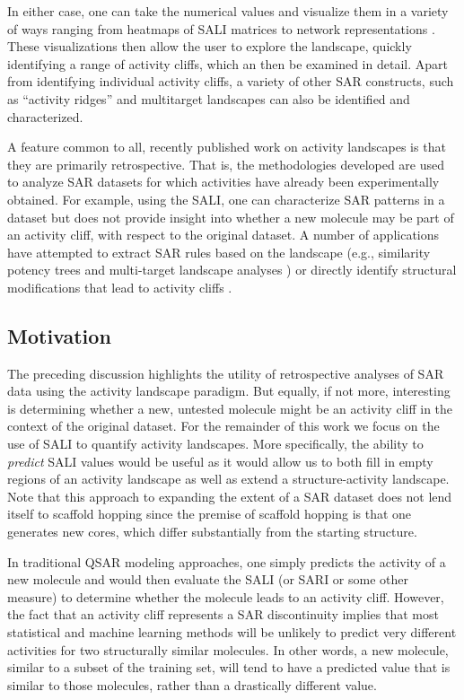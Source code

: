 \documentclass[letterpaper, 12pt]{article}
\begin{document}
In either case, one can take the numerical values and visualize them in a variety of ways ranging
from heatmaps of SALI matrices to network representations \cite{Wawer:2008aa,Guha:2008aa}. These
visualizations then allow the user to explore the landscape, quickly identifying a range of activity
cliffs, which an then be examined in detail. Apart from identifying individual activity cliffs, a
variety of other SAR constructs, such as ``activity ridges'' \cite{Vogt:2011bs} and multitarget
landscapes\cite{Dimova:2011fk} can also be identified and characterized.

A feature common to all, recently published work on activity landscapes is that they are primarily
retrospective. That is, the methodologies developed are used to analyze SAR datasets for which
activities have already been experimentally obtained. For example, using the SALI, one can
characterize SAR patterns in a dataset but does not provide insight into whether a new molecule may
be part of an activity cliff, with respect to the original dataset. A number of applications have
attempted to extract SAR rules based on the landscape (e.g., similarity potency trees
\cite{Wawer:2010fv} and multi-target landscape analyses \cite{Hu:2010kl}) or directly identify
structural modifications that lead to activity cliffs \cite{Wassermann:2010oq, Peltason:2009vn}.

\subsection{Motivation}
\label{sec:motivation}
The preceding discussion highlights the utility of retrospective analyses of SAR data using the
activity landscape paradigm. But equally, if not more, interesting is determining whether a new,
untested molecule might be an activity cliff in the context of the original dataset. For the
remainder of this work we focus on the use of SALI to quantify activity landscapes. More
specifically, the ability to \emph{predict} SALI values would be useful as it would allow us to both
fill in empty regions of an activity landscape as well as extend a structure-activity
landscape. Note that this approach to expanding the extent of a SAR dataset does not lend itself to
scaffold hopping since the premise of scaffold hopping is that one generates new cores, which differ
substantially from the starting structure.

In traditional QSAR modeling approaches, one simply predicts the activity of a new molecule and
would then evaluate the SALI (or SARI or some other measure) to determine whether the molecule leads
to an activity cliff. However, the fact that an activity cliff represents a SAR
discontinuity\cite{Maggiora:2006aa} implies that most statistical and machine learning methods will
be unlikely to predict very different activities for two structurally similar molecules. In other
words, a new molecule, similar to a subset of the training set, will tend to have a predicted value
that is similar to those molecules, rather than a drastically different value.
\end{document}
